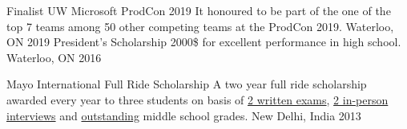 



\begin{cvhonors}
  \cvhonor
    {Finalist UW Microsoft ProdCon 2019} %
    {It honoured to be part of the one of the top
    7 teams among 50 other competing teams at the ProdCon 2019.} %
    {Waterloo, ON} %
    {2019} %
  \cvhonor
    {President's Scholarship} %
    {2000\$ for excellent performance in high school.} %
    {Waterloo, ON} %
    {2016} %

  \cvhonor
    {Mayo International Full Ride Scholarship} %
    {A two year full ride scholarship awarded every year to three students on basis of  \underline{2 written exams},  \underline{2 in-person interviews} and  \underline{outstanding} middle school grades.} %
    {New Delhi, India} %
    {2013} %




\end{cvhonors}

